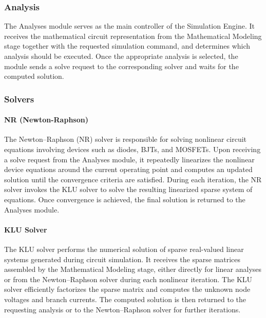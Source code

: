 \subsubsection{Analysis}
The Analyses module serves as the main controller of the Simulation Engine. It receives the mathematical circuit representation from the Mathematical Modeling stage together with the requested simulation command, and determines which analysis should be executed. Once the appropriate analysis is selected, the module sends a solve request to the corresponding solver and waits for the computed solution. 
\subsubsection{Solvers}
\paragraph{NR (Newton-Raphson)}
The Newton–Raphson (NR) solver is responsible for solving nonlinear circuit equations involving devices such as diodes, BJTs, and MOSFETs. Upon receiving a solve request from the Analyses module, it repeatedly linearizes the nonlinear device equations around the current operating point and computes an updated solution until the convergence criteria are satisfied. During each iteration, the NR solver invokes the KLU solver to solve the resulting linearized sparse system of equations. Once convergence is achieved, the final solution is returned to the Analyses module.
\paragraph{KLU Solver}
The KLU solver performs the numerical solution of sparse real-valued linear systems generated during circuit simulation. It receives the sparse matrices assembled by the Mathematical Modeling stage, either directly for linear analyses or from the Newton–Raphson solver during each nonlinear iteration. The KLU solver efficiently factorizes the sparse matrix and computes the unknown node voltages and branch currents. The computed solution is then returned to the requesting analysis or to the Newton–Raphson solver for further iterations.
